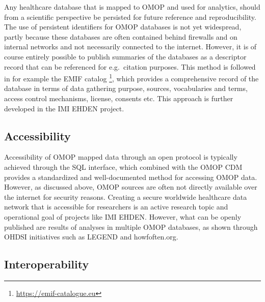 \documentclass[11pt]{book}
\let\rmarkdownfootnote\footnote%
\def\footnote{\protect\rmarkdownfootnote}
\theoremstyle{definition}
\theoremstyle{definition}
\theoremstyle{definition}
\theoremstyle{remark}
\begin{document}
Any healthcare database that is mapped to OMOP and used for analytics, should from a scientific perspective be persisted for future reference and reproducibility. The use of persistent identifiers for OMOP databases is not yet widespread, partly because these databases are often contained behind firewalls and on internal networks and not necessarily connected to the internet. However, it is of course entirely possible to publish summaries of the databases as a descriptor record that can be referenced for e.g.~citation purposes. This method is followed in for example the EMIF catalog \footnote{\url{https://emif-catalogue.eu}}, which provides a comprehensive record of the database in terms of data gathering purpose, sources, vocabularies and terms, access control mechanisms, license, consents etc. \citep{Oliveira2019} This approach is further developed in the IMI EHDEN project.

\hypertarget{accessibility}{%
\subsection{Accessibility}\label{accessibility}}

Accessibility of OMOP mapped data through an open protocol is typically achieved through the SQL interface, which combined with the OMOP CDM provides a standardized and well-documented method for accessing OMOP data. However, as discussed above, OMOP sources are often not directly available over the internet for security reasons. Creating a secure worldwide healthcare data network that is accessible for researchers is an active research topic and operational goal of projects like IMI EHDEN. However, what can be openly published are results of analyses in multiple OMOP databases, as shown through OHDSI initiatives such as LEGEND and howfoften.org.

\hypertarget{interoperability}{%
\subsection{Interoperability}\label{interoperability}}
\end{document}
